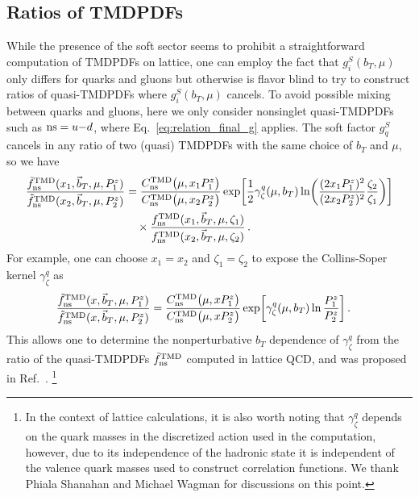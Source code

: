 \documentclass[11pt,a4paper]{article}
\DeclareRobustCommand{\eq}[1]{Eq.~\eqref{eq:#1}}
\DeclareRobustCommand{\mycite}[1]{Ref.~\cite{#1}}
\newcommand{\nn}{\nonumber}
\newcommand\TMD{\mathrm{TMD}}
\newcommand{\bt}{\vec b_T}
\newcommand{\ns}{{\rm ns}}
\begin{document}
\subsection{Ratios of TMDPDFs}
\label{sec:ratios}
While the presence of the soft sector seems to prohibit a straightforward computation of TMDPDFs on lattice,
one can employ the fact that $g_{i}^S(b_T,\mu)$ only differs for quarks and gluons but otherwise is flavor blind
to try to construct ratios of quasi-TMDPDFs where $g_{i}^S(b_T,\mu)$ cancels.
To avoid possible mixing between quarks and gluons, here we only consider nonsinglet quasi-TMDPDFs such as $\ns=u{-}d$,
where \eq{relation_final_g} applies.
The soft factor $g_q^S$ cancels in any ratio of two (quasi) TMDPDFs with the same choice of $b_T$ and $\mu$, so we have
\begin{align} \label{eq:qTMD_ratio}
 \frac{\tilde f_\ns^\TMD(x_1, \bt, \mu, P_1^z)}{\tilde f_\ns^\TMD(x_2, \bt, \mu, P_2^z)}
 &= \frac{C^\TMD_\ns\bigl(\mu, x_1 P_1^z\bigr)}{C^\TMD_\ns\bigl(\mu, x_2 P_2^z\bigr)}
   \exp\biggl[\frac12\gamma_\zeta^q(\mu, b_T) \ln\biggl(\frac{(2 x_1 P_1^z)^2}{(2 x_2 P_2^z)^2} \frac{\zeta_2}{\zeta_1} \biggr)  \biggr]
   \nn\\*&\quad\times
   \frac{f^\TMD_\ns(x_1, \bt, \mu, \zeta_1)}{f^\TMD_\ns(x_2, \bt, \mu, \zeta_2)}
\,.\end{align}
For example, one can choose $x_1 = x_2$ and $\zeta_1 = \zeta_2$ to expose the Collins-Soper kernel $\gamma_\zeta^q$ as
\begin{align}
 \frac{\tilde f_\ns^\TMD(x, \bt, \mu, P_1^z)}{\tilde f_\ns^\TMD(x, \bt, \mu, P_2^z)}
 &= \frac{C^\TMD_\ns\bigl(\mu, x P_1^z\bigr)}{C^\TMD_\ns\bigl(\mu, x P_2^z\bigr)}
   \exp\biggl[ \gamma_\zeta^q(\mu, b_T) \ln\frac{P_1^z}{P_2^z} \biggr]
\,.\end{align}
This allows one to determine the nonperturbative $b_T$ dependence of $\gamma_\zeta^q$ from the ratio of the quasi-TMDPDFs $\tilde f^\TMD_\ns$ computed in lattice QCD, and was proposed in \mycite{Ebert:2018gzl}.%
\footnote{In the context of lattice calculations, it is also worth noting that $\gamma_\zeta^q$ depends on the quark masses in the discretized action used in the computation, however, due to its independence of the hadronic state it is independent of the valence quark masses used to construct correlation functions. We thank Phiala Shanahan and Michael Wagman for discussions on this point.}
\end{document}
